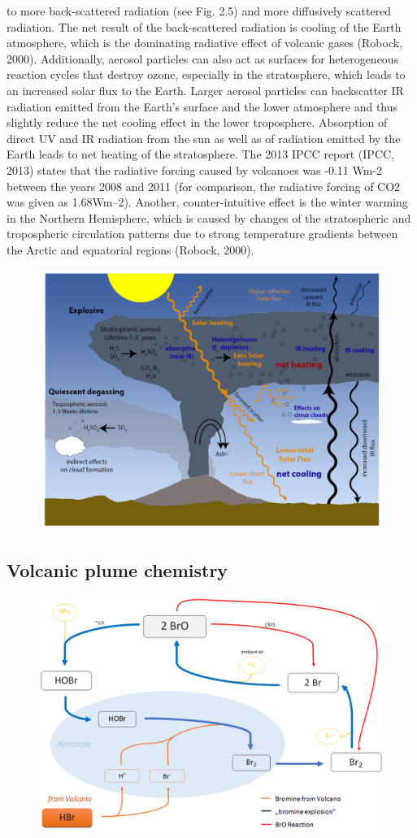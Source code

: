 \documentclass  [
  paper    = a4,
  BCOR     = 10mm,
  twoside,
  fontsize = 12pt,
  fleqn,
  toc      = bibnumbered,
  toc      = listofnumbered,
  numbers  = noendperiod,
  headings = normal,
  listof   = leveldown,
  version  = 3.03
]                                       {scrreprt}
\begin{document}
	to more back-scattered radiation (see Fig. 2.5) and more diffusively scattered radiation. The net result of the back-scattered radiation is cooling of the Earth
	atmosphere, which is the dominating radiative effect of volcanic gases (Robock,
	2000). Additionally, aerosol particles can also act as surfaces for heterogeneous
	reaction cycles that destroy ozone, especially in the stratosphere, which leads to
	an increased solar flux to the Earth. Larger aerosol particles can backscatter IR
	radiation emitted from the Earth’s surface and the lower atmosphere and thus
	slightly reduce the net cooling effect in the lower troposphere. Absorption of
	direct UV and IR radiation from the sun as well as of radiation emitted by the
	Earth leads to net heating of the stratosphere. The 2013 IPCC report (IPCC,
	2013) states that the radiative forcing caused by volcanoes was -0.11 Wm-2
	between the years 2008 and 2011 (for comparison, the radiative forcing of CO2
	was given as 1.68Wm–2). Another, counter-intuitive effect is the winter warming
	in the Northern Hemisphere, which is caused by changes of the stratospheric and
	tropospheric circulation patterns due to strong temperature gradients between
	the Arctic and equatorial regions (Robock, 2000).
	\begin{figure}
		\centering
		\includegraphics[width=0.7\linewidth]{Bilder/Simon/Bilder_Tung/Climate_Influence}
		\caption{}
		\label{fig:climateinfluence}
	\end{figure}
	
	\subsection{Volcanic plume chemistry}

	\begin{figure}
		\centering
		\includegraphics[width=0.7\linewidth]{Bilder/Simon/Bilder_Tung/BrO_Explosion}
		\caption{}
		\label{fig:broexplosion}
	\end{figure}
	
\end{document}
